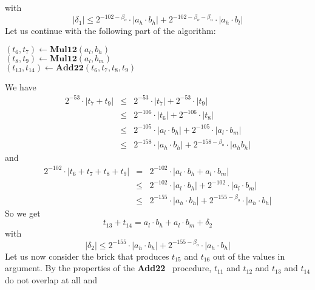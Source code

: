 \documentclass[a4paper,10pt,twoside]{article}
\newenvironment{proof}[1][Proof]{\begin{trivlist}
\item[\hskip \labelsep {\bfseries #1}]}{\end{trivlist}}
\newcommand{\hi}{\ensuremath{\mathit{h}}}
\newcommand{\mi}{\ensuremath{\mathit{m}}}
\newcommand{\lo}{\ensuremath{\mathit{l}}}
\newcommand{\AddDD}{{\bf Add22}}
\newcommand{\mAddDD}{\ensuremath{\mathbf{Add22}}}
\newcommand{\mMul}{\ensuremath{\mathbf{Mul12}}}
\begin{document}
\begin{proof}
with
$$\left \vert \delta_1 \right \vert \leq
2^{-102-\beta_o} \cdot \left \vert a_\hi \cdot b_\hi \right \vert + 2^{-102-\beta_o-\beta_u} \cdot \left \vert a_\hi \cdot b_\lo \right \vert$$
Let us continue with the following part of the algorithm:
\begin{center}
\begin{minipage}[b]{60mm}
$\left( t_6, t_7 \right) \gets \mMul\left( a_\lo, b_\hi \right)$ \\
$\left( t_8, t_9 \right) \gets \mMul\left( a_\lo, b_\mi \right)$ \\
$\left( t_{13}, t_{14} \right) \gets \mAddDD\left( t_6, t_7, t_8, t_9 \right)$
\end{minipage}
\end{center}
We have
\begin{eqnarray*}
2^{-53} \cdot \left \vert t_7 + t_9 \right \vert & \leq & 2^{-53} \cdot \left \vert t_7 \right \vert + 2^{-53} \cdot \left \vert t_9 \right \vert \\
& \leq & 2^{-106} \cdot \left \vert t_6 \right \vert + 2^{-106} \cdot \left \vert t_8 \right \vert \\
& \leq & 2^{-105} \cdot \left \vert a_\lo \cdot b_\hi \right \vert + 2^{-105} \cdot \left \vert a_\lo \cdot b_\mi \right \vert \\
& \leq & 2^{-158} \cdot \left \vert a_\hi \cdot b_\hi \right \vert + 2^{-158-\beta_o} \cdot \left \vert a_\hi b_\hi \right \vert
\end{eqnarray*}
and
\begin{eqnarray*}
2^{-102} \cdot \left \vert t_6 + t_7 + t_8 + t_9 \right \vert & = &  2^{-102} \cdot \left \vert a_\lo \cdot b_\hi + a_\lo \cdot b_\mi \right \vert \\
& \leq & 2^{-102} \cdot \left \vert a_\lo \cdot b_\hi \right \vert + 2^{-102} \cdot \left \vert a_\lo \cdot b_\mi \right \vert \\
& \leq & 2^{-155} \cdot \left \vert a_\hi \cdot b_\hi \right \vert + 2^{-155-\beta_o} \cdot \left \vert a_\hi \cdot b_\hi \right \vert
\end{eqnarray*}
So we get
$$t_{13} + t_{14} = a_\lo \cdot b_\hi + a_\lo \cdot b_\mi + \delta_2$$
with
$$\left \vert \delta_2 \right \vert \leq
2^{-155} \cdot \left \vert a_\hi \cdot b_\hi \right \vert + 2^{-155-\beta_o} \cdot \left \vert a_\hi \cdot b_\hi \right \vert$$
Let us now consider the brick that produces $t_{15}$ and $t_{16}$ out of the values in argument.
By the properties of the \AddDD~ procedure, $t_{11}$ and $t_{12}$ and $t_{13}$ and $t_{14}$ do not overlap at all and

\end{proof}
\end{document}
